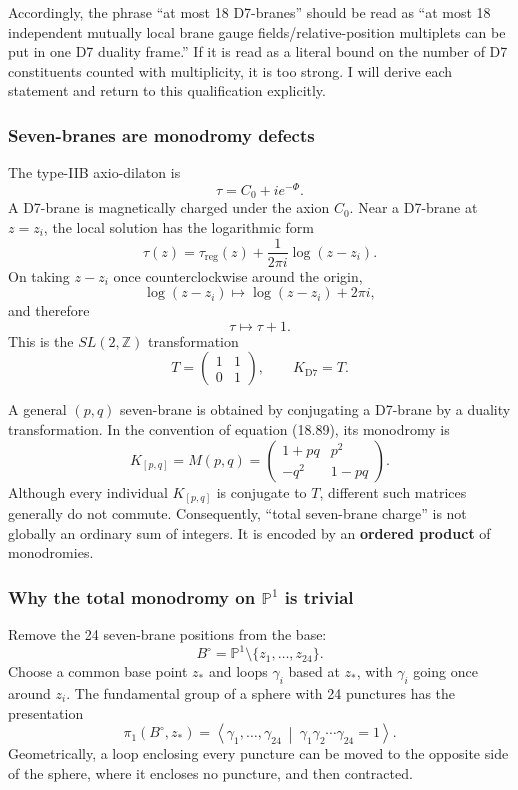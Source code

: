 \documentclass[
  10pt,
  a4paper,
  openany]{book}
\begin{document}
Accordingly, the phrase ``at most 18 D7-branes'' should be read as ``at
most 18 independent mutually local brane gauge fields/relative-position
multiplets can be put in one D7 duality frame.'' If it is read as a
literal bound on the number of D7 constituents counted with
multiplicity, it is too strong. I will derive each statement and return
to this qualification explicitly.

\subsubsection{Seven-branes are monodromy
defects}\label{seven-branes-are-monodromy-defects}

The type-IIB axio-dilaton is \[
\tau=C_0+ie^{-\Phi}.
\] A D7-brane is magnetically charged under the axion \(C_0\). Near a
D7-brane at \(z=z_i\), the local solution has the logarithmic form \[
\tau(z)
=\tau_{\mathrm{reg}}(z)
+\frac{1}{2\pi i}\log(z-z_i).
\] On taking \(z-z_i\) once counterclockwise around the origin, \[
\log(z-z_i)\longmapsto\log(z-z_i)+2\pi i,
\] and therefore \[
\tau\longmapsto\tau+1.
\] This is the \(SL(2,\mathbb Z)\) transformation \[
\boxed{
T=
\begin{pmatrix}
1&1\\
0&1
\end{pmatrix}
},
\qquad
K_{\mathrm{D7}}=T.
\]

A general \((p,q)\) seven-brane is obtained by conjugating a D7-brane by
a duality transformation. In the convention of equation (18.89), its
monodromy is \[
\boxed{
K_{[p,q]}
=M(p,q)
=
\begin{pmatrix}
1+pq&p^2\\
-q^2&1-pq
\end{pmatrix}
}.
\] Although every individual \(K_{[p,q]}\) is conjugate to \(T\),
different such matrices generally do not commute. Consequently, ``total
seven-brane charge'' is not globally an ordinary sum of integers. It is
encoded by an \textbf{ordered product} of monodromies.

\subsubsection{\texorpdfstring{Why the total monodromy on
\(\mathbb P^1\) is
trivial}{Why the total monodromy on \textbackslash mathbb P\^{}1 is trivial}}\label{why-the-total-monodromy-on-mathbb-p1-is-trivial}

Remove the 24 seven-brane positions from the base: \[
B^\circ
=\mathbb P^1\setminus\{z_1,\ldots,z_{24}\}.
\] Choose a common base point \(z_*\) and loops \(\gamma_i\) based at
\(z_*\), with \(\gamma_i\) going once around \(z_i\). The fundamental
group of a sphere with 24 punctures has the presentation \[
\pi_1(B^\circ,z_*)
=
\left\langle
\gamma_1,\ldots,\gamma_{24}
\ \middle|\
\gamma_1\gamma_2\cdots\gamma_{24}=1
\right\rangle.
\] Geometrically, a loop enclosing every puncture can be moved to the
opposite side of the sphere, where it encloses no puncture, and then
contracted.
\end{document}
